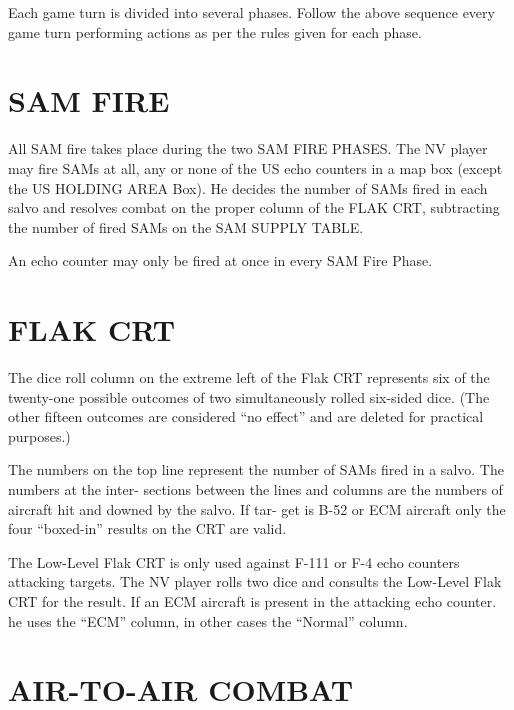 Each game turn is divided into
several phases. Follow the above
sequence every game turn performing
actions as per the rules given for each
phase.

\section*{SAM FIRE}
All SAM fire takes place during the
two SAM FIRE PHASES. The NV
player may fire SAMs at all, any or
none of the US echo counters in a map
box (except the US HOLDING AREA
Box). He decides the number of SAMs
fired in each salvo and resolves
combat on the proper column of the
FLAK CRT, subtracting the number
of fired SAMs on the SAM SUPPLY
TABLE.

An echo counter may only be fired
at once in every SAM Fire Phase.
\section*{FLAK CRT}

The dice roll column on the extreme
left of the Flak CRT represents six of
the twenty-one possible outcomes of
two simultaneously rolled six-sided
dice. (The other fifteen outcomes are
considered ``no effect'' and are
deleted for practical purposes.)

The numbers on the top line
represent the number of SAMs fired
in a salvo. The numbers at the inter-
sections between the lines and
columns are the numbers of aircraft
hit and downed by the salvo. If tar-
get is B-52 or ECM aircraft only the
four ``boxed-in'' results on the CRT
are valid.

The Low-Level Flak CRT is only
used against F-111 or F-4 echo
counters attacking targets. The NV
player rolls two dice and consults the
Low-Level Flak CRT for the result. If
an ECM aircraft is present in the
attacking echo counter. he uses the
``ECM'' column, in other cases the
``Normal'' column.

\section*{AIR-TO-AIR COMBAT}

